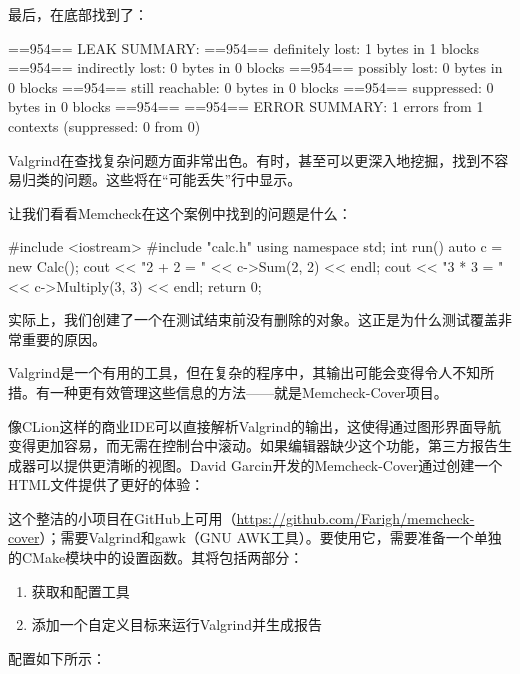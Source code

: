 最后，在底部找到了：

\begin{shell}
==954== LEAK SUMMARY:
==954==    definitely lost: 1 bytes in 1 blocks
==954==    indirectly lost: 0 bytes in 0 blocks
==954==      possibly lost: 0 bytes in 0 blocks
==954==    still reachable: 0 bytes in 0 blocks
==954==         suppressed: 0 bytes in 0 blocks
==954==
==954== ERROR SUMMARY: 1 errors from 1 contexts (suppressed: 0 from 0)
\end{shell}

Valgrind在查找复杂问题方面非常出色。有时，甚至可以更深入地挖掘，找到不容易归类的问题。这些将在“可能丢失”行中显示。

让我们看看Memcheck在这个案例中找到的问题是什么：


\begin{cpp}
#include <iostream>
#include "calc.h"
using namespace std;
int run() {
    auto c = new Calc();
    cout << "2 + 2 = " << c->Sum(2, 2) << endl;
    cout << "3 * 3 = " << c->Multiply(3, 3) << endl;
    return 0;
}
\end{cpp}

实际上，我们创建了一个在测试结束前没有删除的对象。这正是为什么测试覆盖非常重要的原因。

Valgrind是一个有用的工具，但在复杂的程序中，其输出可能会变得令人不知所措。有一种更有效管理这些信息的方法——就是Memcheck-Cover项目。


像CLion这样的商业IDE可以直接解析Valgrind的输出，这使得通过图形界面导航变得更加容易，而无需在控制台中滚动。如果编辑器缺少这个功能，第三方报告生成器可以提供更清晰的视图。David Garcin开发的Memcheck-Cover通过创建一个HTML文件提供了更好的体验：


这个整洁的小项目在GitHub上可用（\url{https://github.com/Farigh/memcheck-cover}）；需要Valgrind和gawk（GNU AWK工具）。要使用它，需要准备一个单独的CMake模块中的设置函数。其将包括两部分：

\begin{enumerate}
\item
获取和配置工具

\item
添加一个自定义目标来运行Valgrind并生成报告
\end{enumerate}

配置如下所示：


